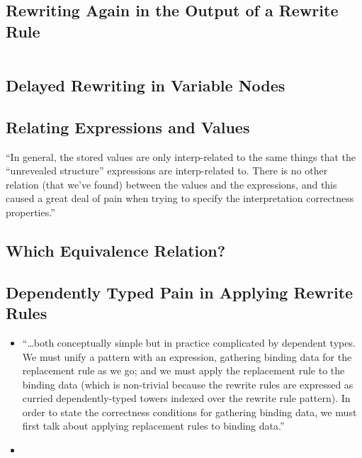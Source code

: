 \subsection{Rewriting Again in the Output of a Rewrite Rule}
$\left.\right.$

\subsection{Delayed Rewriting in Variable Nodes}

\subsection{Relating Expressions and Values}
``In general, the stored values are only interp-related to the same things that the ``unrevealed structure'' expressions are interp-related to. There is no other relation (that we've found) between the values and the expressions, and this caused a great deal of pain when trying to specify the interpretation correctness properties.''

\subsection{Which Equivalence Relation?}

\subsection{Dependently Typed Pain in Applying Rewrite Rules}
\begin{itemize}
\item {}
``\ldots\space both conceptually simple but in practice complicated by dependent types.
We must unify a pattern with an expression, gathering binding data for the replacement rule as we go; and we must apply the replacement rule to the binding data (which is non-trivial because the rewrite rules are expressed as curried dependently-typed towers indexed over the rewrite rule pattern).
In order to state the correctness conditions for gathering binding data, we must first talk about applying replacement rules to binding data.''
\item {}
\end{itemize}

